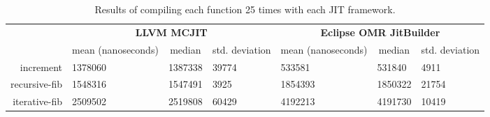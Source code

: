 \begin{table*}[t]
  \begin{tabular}{|r|l|l|l|l||l|l|}
  \hline
  \multicolumn{1}{|l|}{\multirow{2}{*}{}} & \multicolumn{3}{c|}{\textbf{LLVM MCJIT}}                                                                                     & \multicolumn{3}{c|}{\textbf{Eclipse OMR JitBuilder}}                                                                              \\ \cline{2-7}
  \multicolumn{1}{|c|}{\textbf{Program}}  & \multicolumn{1}{c|}{mean (nanoseconds)}  & \multicolumn{1}{c|}{median}  & \multicolumn{1}{c|}{std. deviation}                & \multicolumn{1}{c|}{mean (nanoseconds)}  & \multicolumn{1}{c|}{median}  & \multicolumn{1}{c|}{std. deviation}             \\ \hline
  increment                               & \num{1378060}                            & \num{1387338}                & \num{39774}                                        & \num{533581}                             & \num{531840}                & \num{4911}                                      \\ \hline
  recursive-fib                           & \num{1548316}                            & \num{1547491}                & \num{3925}                                         & \num{1854393}                            & \num{1850322}               & \num{21754}                                     \\ \hline
  iterative-fib                           & \num{2509502}                            & \num{2519808}                & \num{60429}                                        & \num{4192213}                            & \num{4191730}               & \num{10419}                                     \\ \hline
  \end{tabular}
  \caption{Results of compiling each function 25 times with each JIT framework.}
  \label{tab:compile_time}
\end{table*}